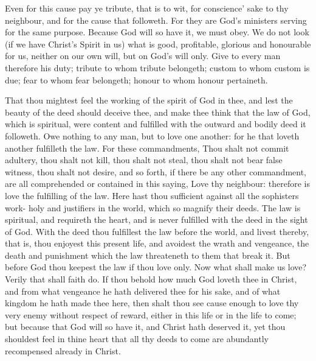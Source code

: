 Even for this cause pay ye tribute, that is to wit, for conscience'
sake to thy neighbour, and for the cause that followeth.
For they are God's ministers serving for the same 
purpose. Because God will so have it, we must obey. 
We do not look (if we have Christ's Spirit in us) what is 
good, profitable, glorious and honourable for us, neither 
on our own will, but on God's will only. Give to every 
man therefore his duty; tribute to whom tribute belongeth;
custom to whom custom is due; fear to whom fear belongeth;
honour to whom honour pertaineth. 

That thou mightest feel the working of the spirit of 
God in thee, and lest the beauty of the deed should deceive
thee, and make thee think that the law of God, 
which is spiritual, were content and fulfilled with the outward
and bodily deed it followeth. Owe nothing to any 
man, but to love one another: for he that loveth another
fulfilleth the law. For these commandments, Thou 
shalt not commit adultery, thou shalt not kill, thou shalt 
not steal, thou shalt not bear false witness, thou shalt not 
desire, and so forth, if there be any other commandment,
are all comprehended or contained in this saying, Love 
thy neighbour: therefore is love the fulfilling of the law. 
Here hast thou sufficient against all the sophisters work-
holy and justifiers in the world, which so magnify their 
deeds. The law is spiritual, and requireth the heart, and 
is never fulfilled with the deed in the sight of God. With 
the deed thou fulfillest the law before the world, and 
livest thereby, that is, thou enjoyest this present life, and 
avoidest the wrath and vengeance, the death and punishment
which the law threateneth to them that break it. 
But before God thou keepest the law if thou love only. 
Now what shall make us love? Verily that shall faith 
do. If thou behold how much God loveth thee in Christ, 
and from what vengeance he hath delivered thee for his 
sake, and of what kingdom he hath made thee here, then 
shalt thou see cause enough to love thy very enemy without
respect of reward, either in this life or in the life to 
come; but because that God will so have it, and Christ 
hath deserved it, yet thou shouldest feel in thine heart 
that all thy deeds to come are abundantly recompensed 
already in Christ. 

